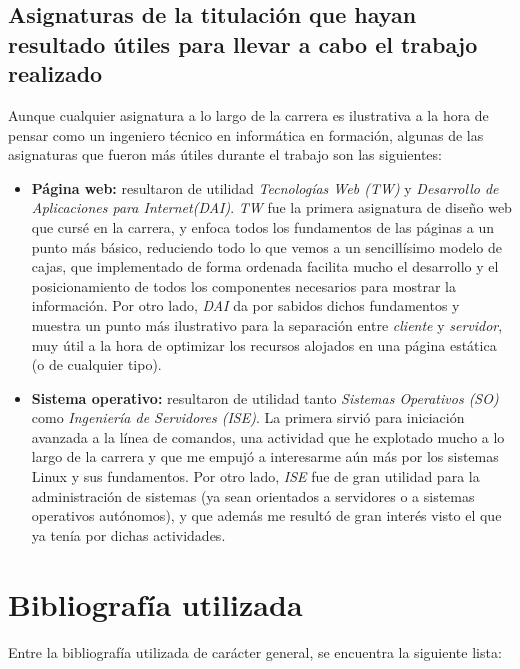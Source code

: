 \documentclass[13pt]{scrartcl}
\begin{document}
		\subsection{Asignaturas de la titulación que hayan resultado útiles para llevar a cabo el trabajo realizado}
			Aunque cualquier asignatura a lo largo de la carrera es ilustrativa a la hora de pensar como un ingeniero técnico en informática en formación, algunas de las asignaturas que fueron más útiles durante el trabajo son las siguientes:
			
			\begin{itemize}
				\item \textbf{Página web:} resultaron de utilidad \textit{Tecnologías Web (TW)} y \textit{Desarrollo de Aplicaciones para Internet(DAI)}. \textit{TW} fue la primera asignatura de diseño web que cursé en la carrera, y enfoca todos los fundamentos de las páginas a un punto más básico, reduciendo todo lo que vemos a un sencillísimo modelo de cajas, que implementado de forma ordenada facilita mucho el desarrollo y el posicionamiento de todos los componentes necesarios para mostrar la información. Por otro lado, \textit{DAI} da por sabidos dichos fundamentos y muestra un punto más ilustrativo para la separación entre \textit{cliente} y \textit{servidor}, muy útil a la hora de optimizar los recursos alojados en una página estática (o de cualquier tipo).
				\item \textbf{Sistema operativo:} resultaron de utilidad tanto \textit{Sistemas Operativos (SO)} como \textit{Ingeniería de Servidores (ISE)}. La primera sirvió para iniciación avanzada a la línea de comandos, una actividad que he explotado mucho a lo largo de la carrera y que me empujó a interesarme aún más por los sistemas Linux y sus fundamentos. Por otro lado, \textit{ISE} fue de gran utilidad para la administración de sistemas (ya sean orientados a servidores o a sistemas operativos autónomos), y que además me resultó de gran interés visto el que ya tenía por dichas actividades.
			\end{itemize}
	
	\section{Bibliografía utilizada}
		Entre la bibliografía utilizada de carácter general, se encuentra la siguiente lista:
		
\end{document}
